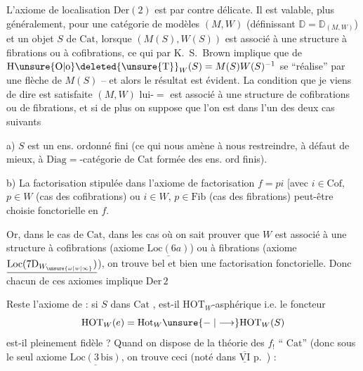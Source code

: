 L'axiome de localisation $\mathrm{Der}(2)$ est par contre   délicate.  Il est valable, plus généralement, pour une catégorie de modèles $(M,W)$ (définissant  $\mathbb{D}=\mathbb{D}_{(M,W)}$) et un objet $S$ de $\mathrm{Cat}$, lorsque $(M(S),W(S))$ est associé à une structure à fibrations ou à cofibrations, ce qui par K.~S.~Brown implique que   de ${\mathrm{H}\unsure{\mathrm{O}|\mathrm{o}}\deleted{\unsure{\mathrm{T}}}}_W(S) =M(S)W(S)^{-1}$ se ``réalise'' par une flèche de $M(S)$ -- et alors le résultat est évident. La condition que je viens de dire est satisfaite    $(M,W)$ lui-\ensuremath{=} est associé à une structure de cofibrations ou de fibrations,
et si de plus on suppose que l'on est dans l'un des deux cas suivants

a) $S$ est un ens. ordonné fini (ce qui nous amène à nous restreindre, à défaut de mieux, à $\mathrm{Diag}={}$-catégorie de $\mathrm{Cat}$ formée des ens. ord finis).

b) La factorisation stipulée dans l'axiome de factorisation $f=pi$ [avec $i\in\mathrm{Cof}$, $p\in W$ (cas des cofibrations) ou $i\in W$, $p\in\mathrm{Fib}$ (cas des fibrations) peut-être choisie fonctorielle en $f$.

Or, dans le cas de $\mathrm{Cat}$, dans les cas où on sait prouver que $W$ est associé à une structure à cofibrations (axiome $\underline{\mathrm{Loc}(6a)}$) ou à fibrations (axiome $\underline{\mathrm{Loc}(7\mathrm{D}_{W_{\unsure{\omega|w|\infty}}})}$), on trouve bel et bien une factorisation fonctorielle. Donc chacun de ces axiomes\unsure{,}  implique $\mathrm{Der}\,2$

Reste l'axiome de  : si $S$ dans $\mathrm{Cat}$ , est-il $\mathrm{HOT}_W$-asphérique i.e. le foncteur
\[
\mathrm{HOT}_W(e)=\mathrm{Hot}_W\unsure{\relbar|\longrightarrow}\mathrm{HOT}_W(S)
\]
est-il pleinement fidèle ? Quand on dispose  de la théorie des $f_!$ `` $\mathrm{Cat}$'' (donc sous le seul axiome $\underline{\mathrm{Loc}(3\,\mathrm{bis})}$, on trouve ceci (noté dans $\underline{\overline{\mathrm{VI}}}$ p.~) :


